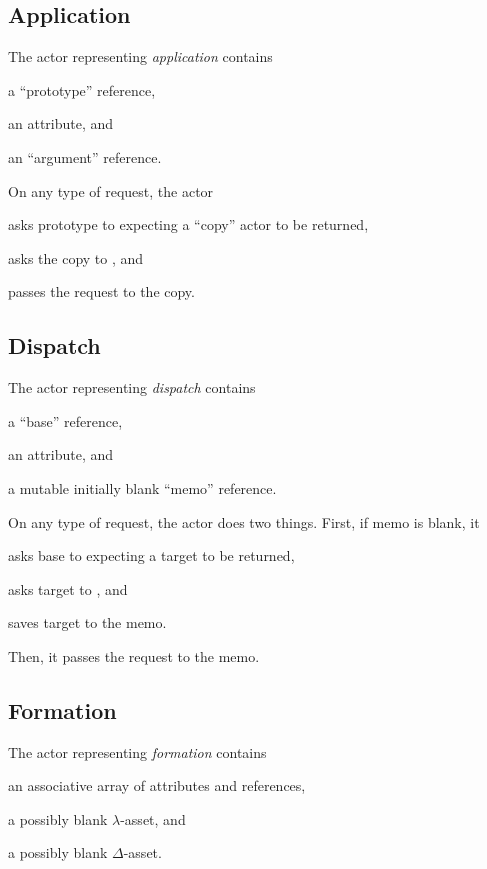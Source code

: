 \subsection{Application}

The actor representing \emph{application} contains
\begin{inparaenum}[1)]
\item a ``prototype'' reference,
\item an attribute,
and
\item an ``argument'' reference.
\end{inparaenum}

On any type of request, the actor
\begin{inparaenum}[1)]
\item asks prototype to  expecting a ``copy'' actor to be returned,
\item asks the copy to ,
and
\item passes the request to the copy.
\end{inparaenum}

\subsection{Dispatch}

The actor representing \emph{dispatch} contains
\begin{inparaenum}[1)]
\item a ``base'' reference,
\item an attribute,
and
\item a mutable initially blank ``memo'' reference.
\end{inparaenum}

On any type of request, the actor does two things.
First, if memo is blank, it
\begin{inparaenum}[1)]
\item asks base to  expecting a target to be returned,
\item asks target to ,
and
\item saves target to the memo.
\end{inparaenum}
Then, it passes the request to the memo.

\subsection{Formation}

The actor representing \emph{formation} contains
\begin{inparaenum}[1)]
\item an associative array of attributes and references,
\item a possibly blank \(\lambda\)-asset,
and
\item a possibly blank \(\Delta\)-asset.
\end{inparaenum}


